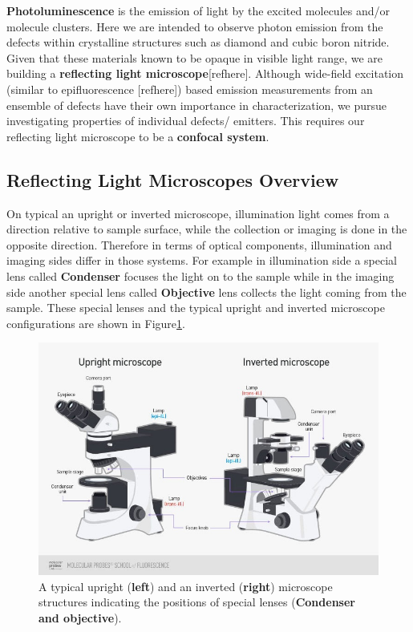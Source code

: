 \textbf{Photoluminescence} is the emission of light by the excited molecules and/or 
molecule clusters. Here we are intended to observe photon emission from the defects 
within crystalline structures such as diamond and cubic boron nitride. Given that these
materials known to be opaque in visible light range, we are building a \textbf{reflecting 
light microscope}[refhere]. Although wide-field excitation (similar to epifluorescence 
[refhere]) based emission measurements from an ensemble of defects have their own 
importance in characterization, we pursue investigating properties of individual defects/
emitters. This requires our reflecting light microscope to be a \textbf{confocal system}.  

\subsection{Reflecting Light Microscopes Overview}
On typical an upright or inverted microscope, illumination light comes from a direction 
relative to sample surface, while the collection or imaging is done in the opposite direction. 
Therefore in terms of optical components, illumination and imaging sides differ in those
systems. For example in illumination side a special lens called \textbf{Condenser} focuses
the light on to the sample while in the imaging side another special lens called \textbf{
Objective} lens collects the light coming from the sample. These special lenses and the
typical upright and inverted microscope configurations are shown in Figure\ref{fig:CondenserAndObjective}.

\begin{figure}[H]
	\centering
	\includegraphics[angle=0,origin=c,width = 1.0\linewidth]{Section_Microscope/Figures/CondenserAndObjective.jpg}
	\caption{A typical upright (\textbf{left}) and an inverted (\textbf{right}) microscope 
		structures indicating the positions of special lenses (\textbf{Condenser and objective}).}
	\label{fig:CondenserAndObjective}
\end{figure}

